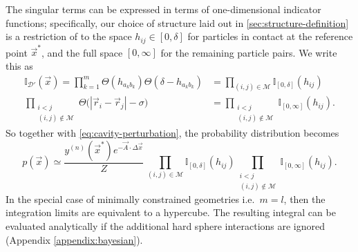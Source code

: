 \documentclass[11pt,twoside]{report}
\begin{document}
The singular terms can be expressed in terms of one-dimensional indicator functions; specifically, our choice of structure laid out in \ref{sec:structure-definition} is a restriction of to the space $h_{ij} \in [0, \delta]$ for particles in contact at the reference point $\vec{x}^*$, and the full space $[0, \infty]$ for the remaining particle pairs.
We write this as
\begin{subequations}
  \begin{align}
    \mathbb{I}_{\mathcal{D}'}(\vec{x})
    =
    \prod_{k = 1}^m
    \Theta ( h_{a_k b_k} )
    \Theta ( \delta - h_{a_k b_k} )
    &=
    \prod_{(i,j) \in \mathcal{M}} \mathbb{I}_{[0, \delta]} (h_{ij})
    \\
    \prod_{\substack{i < j \\ (i,j) \notin \mathcal{M}}}
    \Theta \Big( |\vec{r}_i - \vec{r}_j| - \sigma \Big)
    &=
    \prod_{\substack{i < j \\ (i,j) \notin \mathcal{M}}}
    \mathbb{I}_{[0, \infty]} (h_{ij}).
  \end{align}
\end{subequations}
So together with \eqref{eq:cavity-perturbation}, the probability distribution becomes
\begin{equation}\label{eq:expanded-structure-p}
  p(\vec{x})
  \simeq
  \frac{y^{(n)}(\vec{x}^*) e^{-\vec{A} \cdot \Delta \vec{x}}}{Z}
  \,
  \prod_{(i,j) \in \mathcal{M}} \mathbb{I}_{[0, \delta]}(h_{ij})
  \prod_{\substack{i < j \\ (i,j) \notin \mathcal{M}}}
  \mathbb{I}_{[0, \infty]} (h_{ij}).
\end{equation}
In the special case of minimally constrained geometries i.e.\ $m = l$, then the integration limits are equivalent to a hypercube.
The resulting integral can be evaluated analytically if the additional hard sphere interactions are ignored (Appendix \ref{appendix:bayesian}).
\end{document}
